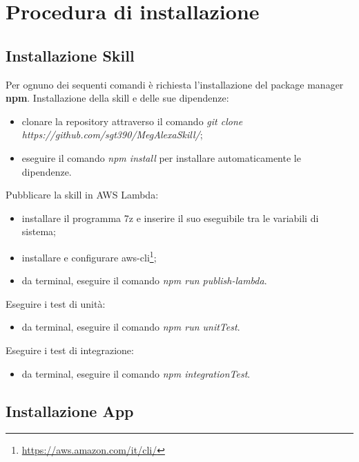 \chapter{Procedura di installazione}

\section{Installazione Skill}
\label{installazioneSkill}
Per ognuno dei sequenti comandi è richiesta l'installazione del package manager \textbf{npm}.
Installazione della skill e delle sue dipendenze:
\begin{itemize}
    \item clonare la repository attraverso il comando \textit{git clone\\https://github.com/sgt390/MegAlexaSkill/};
    \item eseguire il comando \textit{npm install} per installare automaticamente le dipendenze.
\end{itemize}
Pubblicare la skill in AWS Lambda:
\begin{itemize}
    \item installare il programma 7z e inserire il suo eseguibile tra le variabili di sistema;
    \item installare e configurare aws-cli\footnote{\url{https://aws.amazon.com/it/cli/}};
    \item da terminal, eseguire il comando \textit{npm run publish-lambda}.
\end{itemize}
Eseguire i test di unità:
\begin{itemize}
    \item da terminal, eseguire il comando \textit{npm run unitTest}.
\end{itemize}
Eseguire i test di integrazione:
\begin{itemize}
    \item da terminal, eseguire il comando \textit{npm integrationTest}.
\end{itemize}


\section{Installazione App}
\label{installazioneApp}

